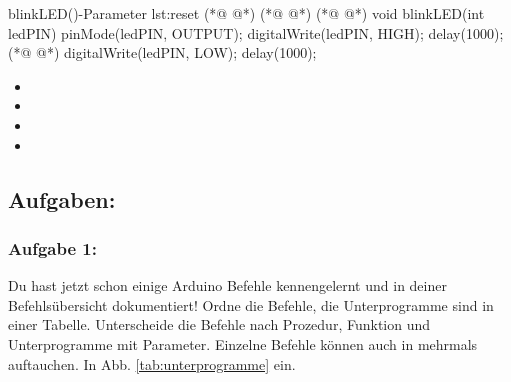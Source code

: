 \clearpage
\begin{multicols}{2}
\null\vfill
\begin{arduinoCode}{ blinkLED()-Parameter }{lst:reset}
  (*@  @*)     (*@  @*)         (*@  @*)
void blinkLED(int ledPIN)
{
  pinMode(ledPIN, OUTPUT);    
  digitalWrite(ledPIN, HIGH);
  delay(1000);                  (*@  @*)
  digitalWrite(ledPIN, LOW);
  delay(1000);  
}
\end{arduinoCode}
\vfill\null 
\columnbreak
\vfill\null 
\begin{itemize}
  \itemsep15pt
    \item[] 
    \item[] 
    \item[] 
    \item[] 
 \end{itemize}
\vfill \null

\end{multicols}

\subsection{Aufgaben:}

\subsubsection{Aufgabe 1:}

Du hast jetzt schon einige Arduino Befehle kennengelernt und in deiner Befehlsübersicht dokumentiert! Ordne die Befehle, die Unterprogramme sind in einer Tabelle. Unterscheide die Befehle nach Prozedur, Funktion und Unterprogramme mit Parameter. Einzelne Befehle können auch in mehrmals auftauchen. In Abb. \ref{tab:unterprogramme} ein.


